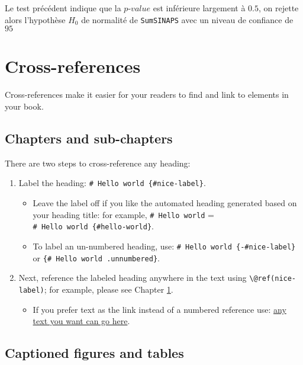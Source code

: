 \documentclass[
]{book}
\providecommand{\tightlist}{%
  \setlength{\itemsep}{0pt}\setlength{\parskip}{0pt}}
\theoremstyle{definition}
\theoremstyle{definition}
\theoremstyle{definition}
\theoremstyle{definition}
\theoremstyle{remark}
\begin{document}
Le test précédent indique que la \(p\)-\(value\) est inférieure largement à \(0.5\), on rejette alors l'hypothèse \(H_0\) de normalité de \texttt{SumSINAPS} avec un niveau de confiance de \(95%
\)

\hypertarget{cross}{%
\chapter{Cross-references}\label{cross}}

Cross-references make it easier for your readers to find and link to elements in your book.

\hypertarget{chapters-and-sub-chapters}{%
\section{Chapters and sub-chapters}\label{chapters-and-sub-chapters}}

There are two steps to cross-reference any heading:

\begin{enumerate}
\def\labelenumi{\arabic{enumi}.}
\tightlist
\item
  Label the heading: \texttt{\#\ Hello\ world\ \{\#nice-label\}}.

  \begin{itemize}
  \tightlist
  \item
    Leave the label off if you like the automated heading generated based on your heading title: for example, \texttt{\#\ Hello\ world} = \texttt{\#\ Hello\ world\ \{\#hello-world\}}.
  \item
    To label an un-numbered heading, use: \texttt{\#\ Hello\ world\ \{-\#nice-label\}} or \texttt{\{\#\ Hello\ world\ .unnumbered\}}.
  \end{itemize}
\item
  Next, reference the labeled heading anywhere in the text using \texttt{\textbackslash{}@ref(nice-label)}; for example, please see Chapter \ref{cross}.

  \begin{itemize}
  \tightlist
  \item
    If you prefer text as the link instead of a numbered reference use: \protect\hyperlink{cross}{any text you want can go here}.
  \end{itemize}
\end{enumerate}

\hypertarget{captioned-figures-and-tables}{%
\section{Captioned figures and tables}\label{captioned-figures-and-tables}}
\end{document}
